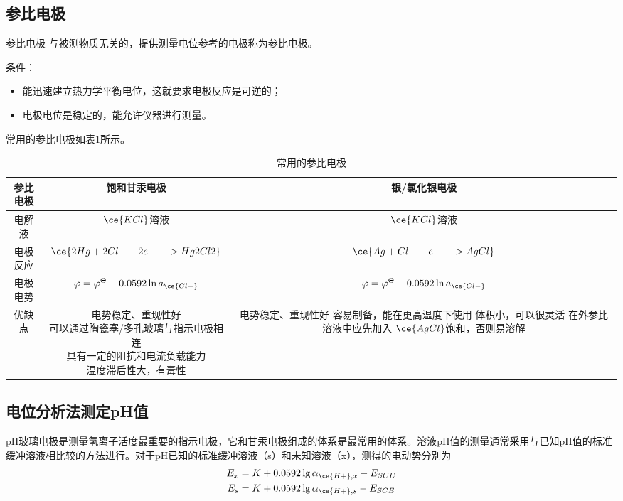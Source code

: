 \subsection{参比电极}

\begin{definition*}{参比电极}{}
	与被测物质无关的，提供测量电位参考的电极称为参比电极。
\end{definition*}

条件：
\begin{itemize}
	\item 能迅速建立热力学平衡电位，这就要求电极反应是可逆的；
	\item 电极电位是稳定的，能允许仪器进行测量。
\end{itemize}

常用的参比电极如表\ref{tab:canbidianji}所示。

\begin{table}[!h]
	\centering
	\caption{常用的参比电极}
	\small
	\begin{tabular}{ccc}
		\toprule
		参比电极  & {饱和甘汞电极} & {银/氯化银电极} \\
		\midrule
		电解液   & $\ce{KCl}$溶液 & $\ce{KCl}$溶液 \\
		电极反应  & $\ce{2Hg + 2Cl- - 2e- -> Hg2Cl2}$ & $\ce{Ag + Cl- - e- -> AgCl}$ \\
		电极电势  & $\varphi=\varphi^{\Theta}- 0.0592\ln a_{\ce{Cl-}}$ & $\varphi=\varphi^{\Theta}-0.0592\ln a_{\ce{Cl-}}$ \\
		\midrule
		优缺点    & \tabincell{c}{电势稳定、重现性好\\ 可以通过陶瓷塞/多孔玻璃与指示电极相连\\具有一定的阻抗和电流负载能力\\温度滞后性大，有毒性} & \tabincell{c}{电势稳定、重现性好\\ 容易制备，能在更高温度下使用\\体积小，可以很灵活\\ 在外参比溶液中应先加入\\$\ce{AgCl}$饱和，否则易溶解} \\
		\bottomrule
	\end{tabular}%
	\normalsize
	\label{tab:canbidianji}%
\end{table}%

\subsection{电位分析法测定pH值}

pH玻璃电极是测量氢离子活度最重要的指示电极，它和甘汞电极组成的体系是最常用的体系。溶液pH值的测量通常采用与已知pH值的标准缓冲溶液相比较的方法进行。对于$\mathrm{pH}$已知的标准缓冲溶液（s）和未知溶液（x），测得的电动势分别为
\begin{gather*}
	E_x=K+0.0592\lg {\alpha_{\ce{H+},x}}-E_{SCE}\\
	E_s=K+0.0592\lg {\alpha_{\ce{H+},s}}-E_{SCE}
\end{gather*}

